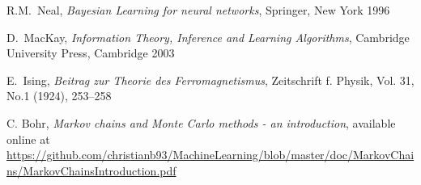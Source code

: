 \documentclass[a4paper, draft]{report}
\numberwithin{section}{chapter}
\numberwithin{equation}{chapter}
\theoremstyle{own}
\theoremstyle{remark}
\begin{document}
\begin{thebibliography}{9}
R.M.~Neal,
{\em Bayesian Learning for neural networks},
Springer, New York 1996

D.~MacKay,
{\em Information Theory, Inference and Learning Algorithms},
Cambridge University Press, Cambridge 2003

E.~Ising,
{\em Beitrag zur Theorie des Ferromagnetismus},
Zeitschrift f. Physik, Vol. 31, No.1 (1924), 253--258

C. Bohr, {\em Markov chains and Monte Carlo methods - an introduction}, available online at \url{https://github.com/christianb93/MachineLearning/blob/master/doc/MarkovChains/MarkovChainsIntroduction.pdf}

\end{thebibliography}
\end{document}
